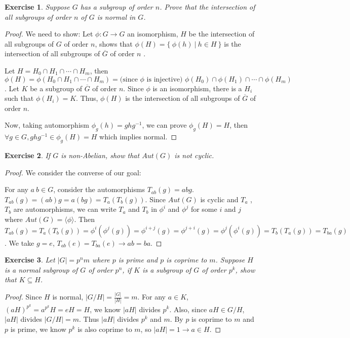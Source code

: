 \documentclass[14pt]{extarticle}
\newtheorem{exercise}{Exercise}[section]
\newcommand{\inv}[1]{#1^{-1}}
\newcommand{\join}[3][,]{#2_0 #1 #2_1 #1 \cdots #1 #2_{#3}}
\newcommand{\1}{\{ e \}}
\begin{document}
\setcounter{exercise}{65}
\begin{exercise}
  Suppose $G$ has a subgroup of order $n$. 
  Prove that the intersection of all subgroups of order $n$ of $G$
  is normal in $G$.
\end{exercise}
\begin{proof}
  We need to show: Let $\phi : G \rightarrow G$ an isomorphism,
  $H$ be the intersection of all subgroups of $G$ of order $n$,
  shows that $\phi(H) = \{ \ \phi(h) \ | \ h \in H \ \}$ 
  is the intersection of all subgroups of $\overline{G}$ of order $n$ .

  Let $H = \join[\cap]{H}{m}$,
  then $\phi(H) = \phi(\join[\cap]{H}{m}) =\text{(since $\phi$ is injective) } \phi(H_0) \cap \phi(H_1) \cap \cdots \cap \phi(H_m)$.
  Let $K$ be a subgroup of $\overline{G}$ of order $n$.
  Since $\phi$ is an isomorphism, there is a $H_i$ such that $\phi(H_i) = K$.
  Thus, $\phi(H)$ is the intersection of all subgroups of $\overline{G}$ of order $n$.

  Now, taking automorphism $\phi_g(h) = gh\inv{g}$, 
  we can prove $\phi_g(H) = H$,
  then $\forall g \in G, gh\inv{g} \in \phi_g(H) = H$ which implies normal.
\end{proof}

\begin{exercise}
  If $G$ is non-Abelian, show that $Aut(G)$ is not cyclic.
\end{exercise}
\begin{proof}
  We consider the converse of our goal:
  \begin{center}
  \end{center}

  For any $a \ b \in G$, consider the automorphisms $T_{ab}(g) = abg$.
  $T_{ab}(g) = (ab)g = a(bg) = T_a(T_b(g))$. 
  Since $Aut(G)$ is cyclic and $T_a$ , $T_b$ are automorphisms, 
  we can write $T_a$ and $T_b$ in $\phi^i$ and $\phi^j$ for some $i$ and $j$
  where $Aut(G) = \langle \phi \rangle$.
  Then $T_{ab}(g) = T_a(T_b(g)) = \phi^i(\phi^j(g)) = \phi^{i + j}(g) = \phi^{j + i}(g) = \phi^j(\phi^i(g)) = T_b(T_a(g)) = T_{ba}(g)$.
  We take $g = e$, $T_{ab}(e) = T_{ba}(e) \rightarrow ab = ba$.
\end{proof}

\begin{exercise}
  Let $|G| = p^n m$ where $p$ is prime and $p$ is coprime to $m$.
  Suppose $H$ is a normal subgroup of $G$ of order $p^n$,
  if $K$ is a subgroup of $G$ of order $p^k$, show that $K \subseteq H$.
\end{exercise}
\begin{proof}
  Since $H$ is normal, $\displaystyle |G/H| = \frac{|G|}{|H|} = m$.
  For any $a \in K$, $(aH)^{p^k} = a^{p^k}H = eH = H$,
  we know $|aH|$ divides $p^k$.
  Also, since $aH \in G/H$, $|aH|$ divides $|G/H| = m$.
  Thus $|aH|$ divides $p^k$ and $m$. By $p$ is coprime to $m$ and $p$ is prime,
  we know $p^k$ is also coprime to $m$, so $|aH| = 1 \rightarrow a \in H$.
\end{proof}
\end{document}
